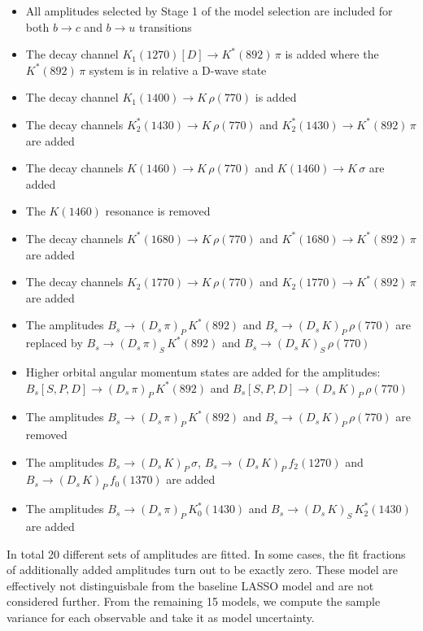 \begin{itemize}

	\item All amplitudes selected by Stage 1 of the model selection are included for both $b\to c$ and $b\to u$ transitions
				
	\item The decay channel $K_1(1270)[D] \to K^*(892) \, \pi$ is added where the $K^*(892) \, \pi$ system is in relative a D-wave state

	\item The decay channel $K_1(1400) \to K \, \rho(770)$ is added
	
	\item The decay channels $K_2^*(1430) \to K \, \rho(770)$ and $K_2^*(1430) \to K^*(892) \, \pi$ are added
	
	\item The decay channels $K(1460) \to K \, \rho(770)$ and $K(1460) \to K \, \sigma$ are added
	
	\item The $K(1460)$ resonance is removed
	
	\item The decay channels $K^*(1680) \to K \, \rho(770)$ and $K^*(1680) \to K^*(892) \, \pi$ are added
	
	\item The decay channels $K_2(1770) \to K \, \rho(770)$ and $K_2(1770)  \to K^*(892) \, \pi$ are added
		
	\item The amplitudes $B_s \to (D_s \, \pi)_{P} \, K^{*}(892)$ and $B_s \to (D_s \, K)_{P} \, \rho(770)$ are replaced by 
		$B_s \to (D_s \, \pi)_{S} \, K^{*}(892)$ and $B_s \to (D_s \, K)_{S} \, \rho(770)$
	
	\item Higher orbital angular momentum states are added for the amplitudes: $B_s[S,P,D] \to (D_s \, \pi)_{P} \, K^{*}(892)$ and $B_s[S,P,D] \to (D_s \, K)_{P} \, \rho(770)$
	
	\item The amplitudes $B_s \to (D_s \, \pi)_{P} \, K^{*}(892)$ and $B_s \to (D_s \, K)_{P} \, \rho(770)$ are removed

	\item The amplitudes $B_s \to (D_s \, K)_{P} \, \sigma$, $B_s \to (D_s \, K)_{P} \, f_2(1270)$ and $B_s \to (D_s \, K)_{P} \, f_0(1370)$ are added

	\item The amplitudes $B_s \to (D_s \, \pi)_{P} \, K_0^*(1430)$ and $B_s \to (D_s \, K)_{S} \, K_2^*(1430)$ are added

\end{itemize}
%
In total 20 different sets of amplitudes are fitted. In some cases, the fit fractions of additionally added amplitudes turn out to be exactly zero.
These model are effectively not distinguisbale from the baseline LASSO model and are not considered further.
From the remaining 15 models, we compute the sample variance for each observable and take it as model uncertainty.

